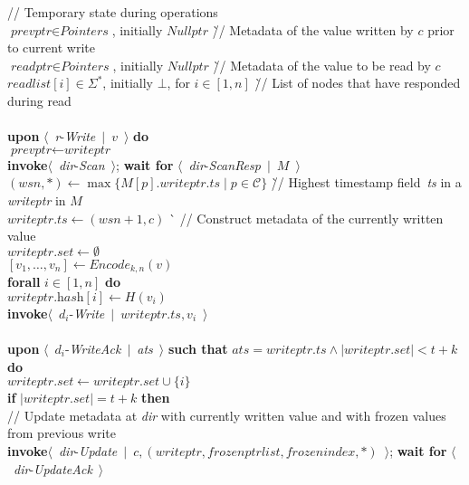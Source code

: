 \documentclass[oribibl]{llncs}
\theoremstyle{definition-boldhead}
\newcommand{\var}[1]{\textit{#1}}
\newcommand{\newe}{{\bf invoke}\xspace}
\newcommand{\event}[2]{$\langle$~{\var{#1}}-\textsl{#2}~$\rangle$}
\newcommand{\eventt}[3]{$\langle$~{\var{#1}}-\textsl{#2}~$\mid$~{#3}~$\rangle$}
\newcommand{\becomes}{\ensuremath{\leftarrow}}
\newcommand{\clientset}{\ensuremath{\mathcal{C}}\xspace}
\newcommand{\strings}{\ensuremath{\Sigma^{*}}}
\newcommand{\dir}{\var{dir}\xspace}
\newcommand{\nodes}{nodes\xspace}
\begin{document}
\begin{alg}
\begin{tabbing}
  \> // Temporary state during operations \\
  \> $\var{prevptr} \in \var{Pointers}$, initially $\var{Nullptr}$
     \` // Metadata of the value written by $c$ prior to current write \\
  \> $\var{readptr} \in \var{Pointers}$, initially $\var{Nullptr}$
     \` // Metadata of the value to be read by $c$ \\
  \> $\var{readlist}[i] \in \strings$, initially $\bot$, for $i \in [1,n]$
     \` // List of \nodes that have responded during read \\
  \\
  \textbf{upon} \eventt{r}{Write}{$v$} \textbf{do} \\
  \> $\var{prevptr} \becomes \var{writeptr}$ \\
\> \newe \event{dir}{Scan};
     \textbf{wait for} \eventt{dir}{ScanResp}{$M$} \\
  \> $(\var{wsn}, \ast) \becomes
        \max \{ M[p].\var{writeptr}.\var{ts} \;|\; p \in \clientset \}$
     \` // Highest timestamp field~\var{ts} in a \var{writeptr} in $M$ \\
  \> $\var{writeptr}.\var{ts} \becomes (\var{wsn} + 1, c)$
     \` \> // Construct metadata of the currently written value \\
  \> $\var{writeptr}.\var{set} \leftarrow \emptyset$ \\
  \> $[v_1, \ldots, v_n] \leftarrow \var{Encode}_{k,n}(v)$ \\
  \> \textbf{forall} $i \in [1,n]$ \textbf{do} \\
  \> \> $\var{writeptr}.\var{hash}[i] \becomes H(v_i)$ \\
  \> \> \newe \eventt{$d_i$}{Write}{$\var{writeptr}.\var{ts}, v_i$} \\
  \\
  \textbf{upon} \eventt{$d_i$}{WriteAck}{\var{ats}} \textbf{such that}
  	$\var{ats} = \var{writeptr}.\var{ts} \land
         |\var{writeptr}.\var{set}| < t+k$ \textbf{do} \\
  \> $\var{writeptr}.\var{set} \becomes \var{writeptr}.\var{set} \cup \{i\}$ \\
  \> \textbf{if} $|\var{writeptr}.\var{set}| = t+k$ \textbf{then} \\
\> \> // Update metadata at \dir with currently written value
           and with frozen values from previous write \\
  \> \> \newe \eventt{dir}{Update}{$c, (\var{writeptr},
           \var{frozenptrlist}, \var{frozenindex}, \ast)$};
        \textbf{wait for} \event{dir}{UpdateAck} \\

\end{tabbing}
\end{alg}
\end{document}
